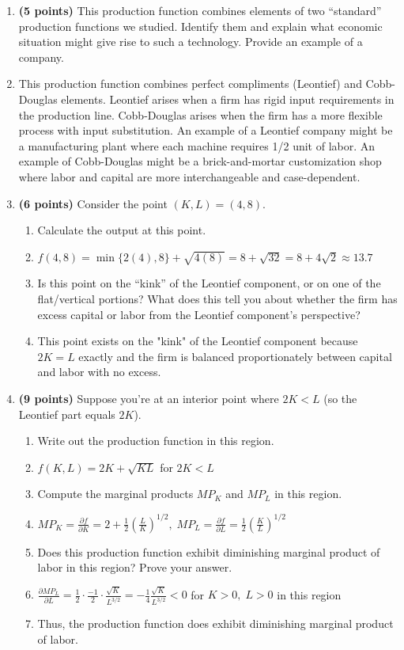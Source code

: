 \documentclass[11pt]{article}
\begin{document}
\begin{enumerate}[label=(\alph*)]
    \item \textbf{(5 points)} This production function combines elements of two ``standard'' production functions we studied. Identify them and explain what economic situation might give rise to such a technology. Provide an example of a company.
    \item[] This production function combines perfect compliments (Leontief) and Cobb-Douglas elements. Leontief arises when a firm has rigid input requirements in the production line. Cobb-Douglas arises when the firm has a more flexible process with input substitution. An example of a Leontief company might be a manufacturing plant where each machine requires 1/2 unit of labor. An example of Cobb-Douglas might be a brick-and-mortar customization shop where labor and capital are more interchangeable and case-dependent.

    \item \textbf{(6 points)} Consider the point $(K,L) = (4,8)$.
    \begin{enumerate}[label=(\roman*)]
        \item Calculate the output at this point.
        \item[] $f(4,8)=\min\{2(4),8\}+\sqrt{4(8)}=8+\sqrt{32}=8+4\sqrt{2}\approx13.7$
        \item Is this point on the ``kink'' of the Leontief component, or on one of the flat/vertical portions? What does this tell you about whether the firm has excess capital or labor from the Leontief component’s perspective?
        \item[] This point exists on the "kink" of the Leontief component because $2K=L$ exactly and the firm is balanced proportionately between capital and labor with no excess.
    \end{enumerate}

    \item \textbf{(9 points)} Suppose you’re at an interior point where $2K < L$ (so the Leontief part equals $2K$).
    \begin{enumerate}[label=(\roman*)]
        \item Write out the production function in this region.
        \item[] $f(K,L)=2K+\sqrt{KL}$ for $2K<L$
        \item Compute the marginal products $MP_K$ and $MP_L$ in this region.
        \item[] $MP_K=\frac{\partial f}{\partial K}=2+\frac{1}{2}(\frac{L}{K})^{1/2},\; MP_L=\frac{\partial f}{\partial L}=\frac{1}{2}(\frac{K}{L})^{1/2}$
        \item Does this production function exhibit diminishing marginal product of labor in this region? Prove your answer.
        \item[] $\frac{\partial MP_L}{\partial L}=\frac{1}{2}\cdot\frac{-1}{2}\cdot\frac{\sqrt{K}}{L^{3/2}}=-\frac{1}{4}\frac{\sqrt{K}}{L^{3/2}}<0$ for $K>0,\;L>0$ in this region
        \item[] Thus, the production function does exhibit diminishing marginal product of labor.
    \end{enumerate}
\end{enumerate}
\end{document}
